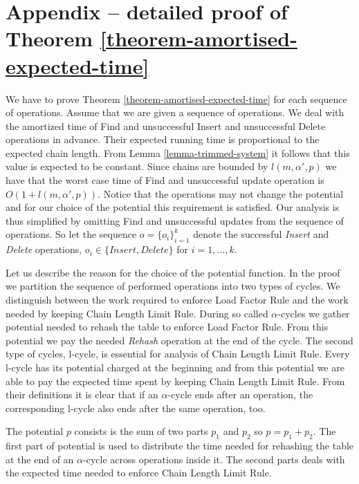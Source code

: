 \section*{Appendix -- detailed proof of Theorem \ref{theorem-amortised-expected-time}}
We have to prove Theorem \ref{theorem-amortised-expected-time} for each sequence of operations. Assume that we are given a sequence of operations. We deal with the amortized time of Find and unsuccessful Insert and unsuccessful Delete operations in advance. Their expected running time is proportional to the expected chain length. From Lemma \ref{lemma-trimmed-system} it follows that this value is expected to be constant. Since chains are bounded by $l(m, \alpha', p)$ we have that the worst case time of Find and unsuccessful update operation is $O(1 + l(m, \alpha', p))$. Notice that the operations may not change the potential and for our choice of the potential this requirement is satisfied. Our analysis is thus simplified by omitting Find and unsuccessful updates from the sequence of operations. So let the sequence $o = \{o_i\}_{i=1}^{k}$ denote the successful \emph{Insert} and \emph{Delete} operations, $o_i \in \{Insert, Delete\}$ for $i = 1, \dots, k$.

Let us describe the reason for the choice of the potential function. In the proof we partition the sequence of performed operations into two types of cycles. We distinguish between the work required to enforce Load Factor Rule and the work needed by keeping Chain Length Limit Rule. During so called $\alpha$-cycles we gather potential needed to rehash the table to enforce Load Factor Rule. From this potential we pay the needed \emph{Rehash} operation at the end of the cycle. The second type of cycles, l-cycle, is essential for analysis of Chain Length Limit Rule. Every l-cycle has its potential charged at the beginning and from this potential we are able to pay the expected time spent by keeping Chain Length Limit Rule. From their definitions it is clear that if an $\alpha$-cycle ends after an operation, the corresponding l-cycle also ends after the same operation, too. 

The potential $p$ consists is the sum of two parts $p_1$ and $p_2$ so $p = p_1 + p_2$. The first part of potential is used to distribute the time needed for rehashing the table at the end of an $\alpha$-cycle across operations inside it. The second parts deals with the expected time needed to enforce Chain Length Limit Rule.

